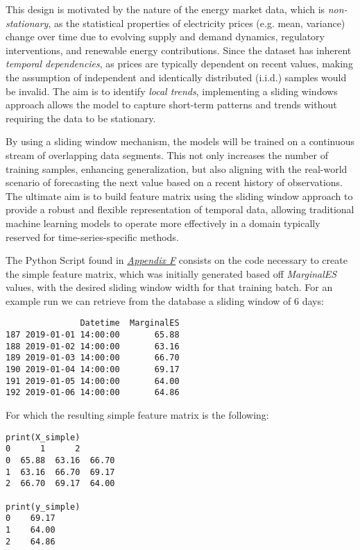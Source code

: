 \documentclass[12pt]{report} %
\begin{document}
This design is motivated by the nature of the energy market data, which is \textit{non-stationary}, as the statistical properties of electricity prices (e.g. mean, variance) change over time due to evolving supply and demand dynamics, regulatory interventions, and renewable energy contributions. Since the dataset has inherent \textit{temporal dependencies}, as prices are typically dependent on recent values, making the assumption of independent and identically distributed (i.i.d.) samples would be invalid. The aim is to identify \textit{local trends}, implementing a sliding windows approach allows the model to capture short-term patterns and trends without requiring the data to be stationary.

By using a sliding window mechanism, the models will be trained on a continuous stream of overlapping data segments. This not only increases the number of training samples, enhancing generalization, but also aligning with the real-world scenario of forecasting the next value based on a recent history of observations. The ultimate aim is to build feature matrix using the sliding window approach to provide a robust and flexible representation of temporal data, allowing traditional machine learning models to operate more effectively in a domain typically reserved for time-series-specific methods.

The Python Script found in \textit{\hyperref[app:appendix_f_simple_feature_matrix]{Appendix F}} consists on the code necessary to create the simple feature matrix, which was initially generated based off \textit{MarginalES} values, with the desired sliding window width for that training batch. For an example run we can retrieve from the database a sliding window of 6 days:
\begin{small}
\begin{verbatim}
               Datetime  MarginalES
187 2019-01-01 14:00:00       65.88
188 2019-01-02 14:00:00       63.16
189 2019-01-03 14:00:00       66.70
190 2019-01-04 14:00:00       69.17
191 2019-01-05 14:00:00       64.00
192 2019-01-06 14:00:00       64.86
\end{verbatim}
\end{small}

For which the resulting simple feature matrix is the following:
\begin{small}
\begin{verbatim}
print(X_simple)
0      1      2
0  65.88  63.16  66.70
1  63.16  66.70  69.17
2  66.70  69.17  64.00

print(y_simple)
0    69.17
1    64.00
2    64.86
\end{verbatim}
\end{small}
\end{document}
